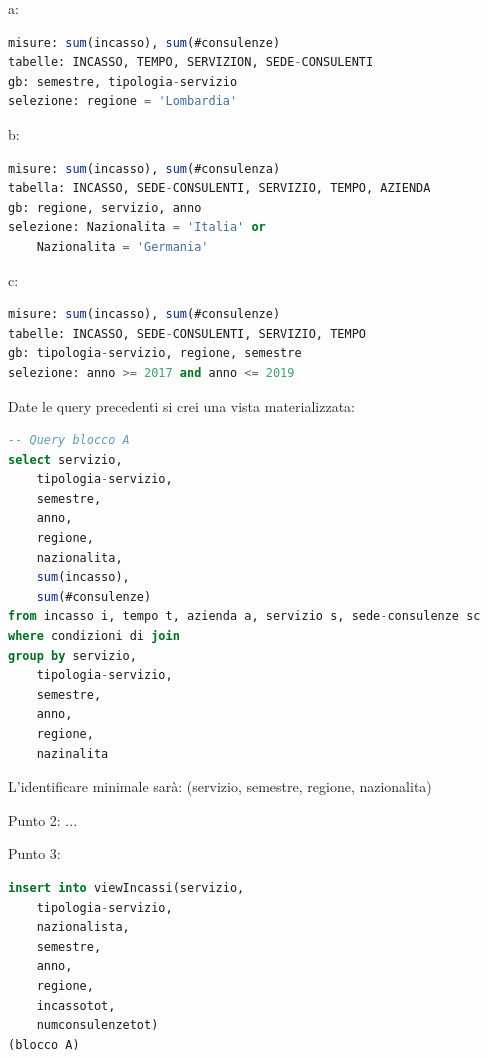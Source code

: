 \documentclass[12pt]{article}
\begin{document}
a:
\begin{lstlisting}[language=sql]
misure: sum(incasso), sum(#consulenze)
tabelle: INCASSO, TEMPO, SERVIZION, SEDE-CONSULENTI
gb: semestre, tipologia-servizio
selezione: regione = 'Lombardia'
\end{lstlisting}

b:
\begin{lstlisting}[language=sql]
misure: sum(incasso), sum(#consulenza)
tabella: INCASSO, SEDE-CONSULENTI, SERVIZIO, TEMPO, AZIENDA
gb: regione, servizio, anno
selezione: Nazionalita = 'Italia' or
    Nazionalita = 'Germania'
\end{lstlisting}

c:
\begin{lstlisting}[language=sql]
misure: sum(incasso), sum(#consulenze)
tabelle: INCASSO, SEDE-CONSULENTI, SERVIZIO, TEMPO
gb: tipologia-servizio, regione, semestre
selezione: anno >= 2017 and anno <= 2019
\end{lstlisting}

Date le query precedenti si crei una vista materializzata:
\begin{lstlisting}[language=sql]
-- Query blocco A
select servizio,
    tipologia-servizio,
    semestre,
    anno,
    regione,
    nazionalita,
    sum(incasso),
    sum(#consulenze)
from incasso i, tempo t, azienda a, servizio s, sede-consulenze sc
where condizioni di join
group by servizio,
    tipologia-servizio,
    semestre,
    anno,
    regione,
    nazinalita
\end{lstlisting}

L'identificare minimale sar\`a: (servizio, semestre, regione, nazionalita)

Punto 2:
...

Punto 3:
\begin{lstlisting}[language=sql]
insert into viewIncassi(servizio,
    tipologia-servizio,
    nazionalista,
    semestre,
    anno,
    regione,
    incassotot,
    numconsulenzetot)
(blocco A)
\end{lstlisting}
\end{document}
